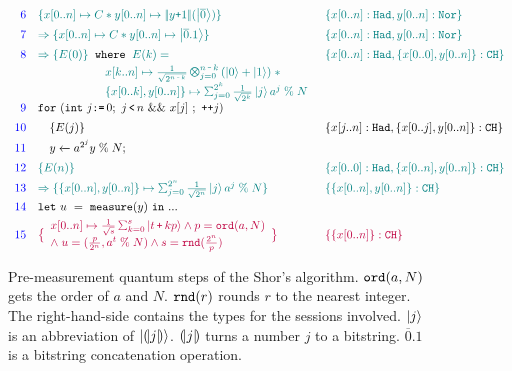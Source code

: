 \begin{figure}[t]
{\[\begin{array}{r l l}
\textcolor{blue}{6}
&
\textcolor{teal}{
\{x[0..n] \mapsto C * y[0..n] \mapsto \dabs{y\splus 1}(\ket{\overline{0}}) \}
}
&
\textcolor{teal}{
\{x[0..n]: \thadt, y[0..n]: \tnort\}
}
\\[0.5em]
\textcolor{blue}{7}
&
\textcolor{teal}{
\Rightarrow
\{x[0..n] \mapsto C * y[0..n] \mapsto \ket{\overline{0}.1} \}
}
&
\textcolor{teal}{
\{x[0..n]: \thadt, y[0..n]: \tnort\}
}
\\[0.5em]
\textcolor{blue}{8}
& 
\textcolor{teal}{
\Rightarrow
\{ E(0) \}
}
\;\;
\texttt{where}\;\;
\textcolor{teal}{E(k) =}
&
\textcolor{teal}{
\{x[0..n]: \thadt, \{x[0..0],y[0..n]\}: \tcht\}
}
\\[0.2em]
&
\qquad\qquad\quad\;
\textcolor{teal}{
\begin{array}{l}
x[k..n] \mapsto \shad{2^{n \,\sminus\,  k}}{n \,\sminus\, k}{}\;*
\\[0.2em]
\{x[0..k],y[0..n]\} \mapsto \scha{2^k}{\frac{1}{\sqrt{2^k}}}{j}{a^{j}\;\%\;N}
\end{array}
}
\\[0.5em]
\textcolor{blue}{9}
&\sqforh{\sint{j}{0}}{j\,\slt\, n}{x[j]}{\dplus{j}}
\\[0.5em]
\textcolor{blue}{10}
&
\quad\{E(j) \}
&
\{x[j..n]: \thadt, \{x[0..j],y[0..n]\}: \tcht\}
\\[0.4em]
\textcolor{blue}{11}
&
\quad\ssassign{y}{}{a^{2^j}y\;\%\; N};
\\[0.5em]
\textcolor{blue}{12}
&
\textcolor{teal}{
\{E(n) \}
}
&
\textcolor{teal}{
\{x[0..0]: \thadt, \{x[0..n],y[0..n]\}: \tcht\}
}
\\[0.4em]
\textcolor{blue}{13}
&
\textcolor{teal}{
\Rightarrow
\{\{x[0..n],y[0..n]\} \mapsto \scha{2^{n}}{\frac{1}{\sqrt{2^{n}}}}{j}{a^{j}\;\%\;N} \}
}
&
\textcolor{teal}{
\{\{x[0..n],y[0..n]\}: \tcht\}
}
\\[0.4em]
\textcolor{blue}{14}
& \sexp{u}{\smea{y}}{...}
\\[0.4em]
\textcolor{blue}{15}
&
\textcolor{purple}{
\big{\{}
\begin{array}{l}
x[0..n] \mapsto \smch{\frac{1}{\sqrt{s}}}{s}{t\,\splus\,k p} 
\wedge
p = \texttt{ord}(a,N)
\\
\wedge\;
u=(\frac{p}{2^n},a^{t}\;\%\;N)
\wedge
s=\texttt{rnd}(\frac{2^n}{p})
\end{array}
\big{\}}
}
&
\textcolor{purple}{
\{\{x[0..n]\}: \tcht\}
}
\end{array}
\]
}
\caption{Pre-measurement quantum steps of the Shor's algorithm. $\texttt{ord}({a,N})$ gets the order of $a$ and $N$. $\texttt{rnd}({r})$ rounds $r$ to the nearest integer. The right-hand-side contains the types for the sessions involved. $\left\vert{j}\right\rangle$ is an abbreviation of $\left\vert{(\!| j |\!)}\right\rangle$.
$(\!| j |\!)$ turns a number $j$ to a bitstring. $\overline{0}.1$ is a bitstring concatenation operation. }
\label{fig:shorqafny}
\end{figure}

